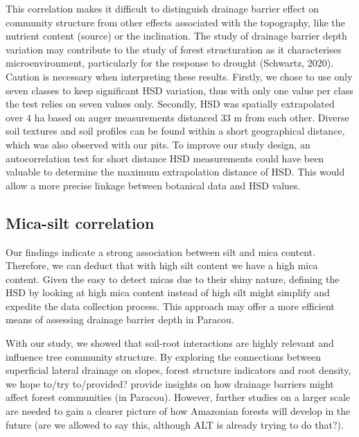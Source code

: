 \documentclass[fleqn,10pt]{latex/stylish_article} %
\begin{document}
This correlation makes it difficult to distinguish drainage barrier effect on community structure from other effects associated with the topography, like the nutrient content (source) or the inclination. The study of drainage barrier depth variation may contribute to the study of forest structuration as it characterises microenvironment, particularly for the response to drought (Schwartz, 2020).
Caution is necessary when interpreting these results. Firstly, we chose to use only seven classes to keep significant HSD variation, thus with only one value per class the test relies on seven values only. Secondly, HSD was spatially extrapolated over 4 ha based on auger measurements distanced 33 m from each other. Diverse soil textures and soil profiles can be found within a short geographical distance, which was also observed with our pits. To improve our study design, an autocorrelation test for short distance HSD measurements could have been valuable to determine the maximum extrapolation distance of HSD. This would allow a more precise linkage between botanical data and HSD values.

\hypertarget{mica-silt-correlation}{%
\subsection{Mica-silt correlation}\label{mica-silt-correlation}}

Our findings indicate a strong association between silt and mica content. Therefore, we can deduct that with high silt content we have a high mica content. Given the easy to detect micas due to their shiny nature, defining the HSD by looking at high mica content instead of high silt might simplify and expedite the data collection process. This approach may offer a more efficient means of assessing drainage barrier depth in Paracou.

With our study, we showed that soil-root interactions are highly relevant and influence tree community structure. By exploring the connections between superficial lateral drainage on slopes, forest structure indicators and root density, we hope to/try to/provided? provide insights on how drainage barriers might affect forest communities (in Paracou). However, further studies on a larger scale are needed to gain a clearer picture of how Amazonian forests will develop in the future (are we allowed to say this, although ALT is already trying to do that?).



\makeatletter

\makeatother


\end{document}
